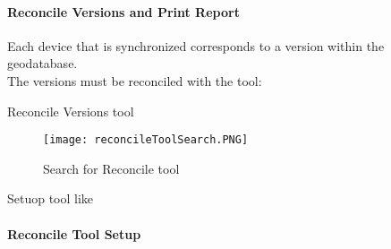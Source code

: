 \vspace{.75in}


\clearpage









\paragraph{Reconcile Versions and Print Report}


\vspace{.5in}

Each device that is synchronized corresponds to a version within the geodatabase.\\

\noindent The versions must be reconciled with the tool:\\



Reconcile Versions tool



\vspace{1in}

\begin{wrapfigure}{r}{0.5\textwidth}

\centering
    \texttt{[image: reconcileToolSearch.PNG]}
\caption{Search for Reconcile tool}


\end{wrapfigure}




\clearpage


Setuop tool like


\paragraph{Reconcile Tool Setup}


